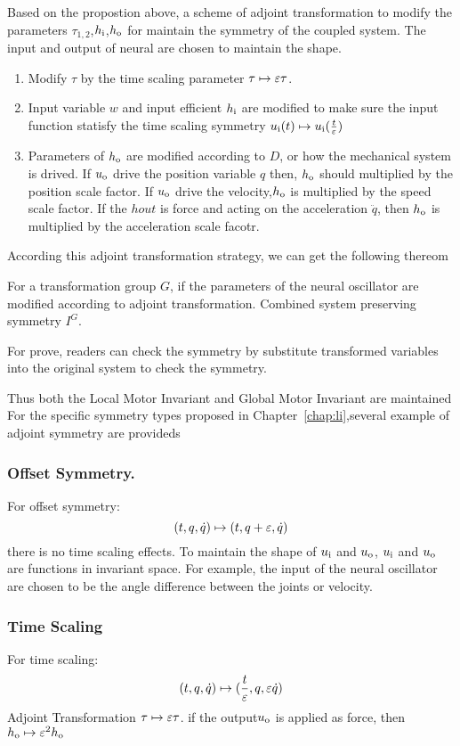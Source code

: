 Based on the propostion above, a scheme of adjoint transformation to modify the parameters $\tau_{1,2}$,$h_{\mathrm{i}}$,$h_{\mathrm{o}}$ for maintain the symmetry of the  coupled system.
The input and output of neural are chosen to maintain the shape.
\begin{enumerate}
\item Modify $\tau$ by the time scaling parameter $\tau \mapsto \varepsilon \tau$.
\item Input variable $w$ and input efficient $h_{\mathrm{i}}$ are modified to make sure the input function statisfy the time scaling symmetry $u_{\mathrm{i}}(t) \mapsto u_{\mathrm{i}}(\frac{t}{\varepsilon})$
\item  Parameters of $h_{\mathrm{o}}$ are modified according to $D$, or how the mechanical system is drived.
If $u_{\mathrm{o}}$ drive the position variable $q$ then, $h_{\mathrm{o}}$ should multiplied by the position scale factor. 
If $u_{\mathrm{o}}$ drive the velocity,$h_{\mathrm{o}}$ is multiplied by the speed scale factor.
If the $hout$ is force and acting on the acceleration $\ddot{q}$, then $h_{\mathrm{o}}$ is multiplied by the acceleration scale facotr.
\end{enumerate}


According this adjoint transformation strategy, we can get the following thereom
\begin{mythe}
For a transformation group $G$, if the parameters of the neural oscillator are modified according to adjoint transformation.
 Combined system preserving symmetry $I^G$.
\end{mythe}
For prove, readers can check the symmetry by substitute transformed variables into the original system to check the symmetry.

Thus both the Local Motor Invariant and Global Motor Invariant are maintained
For the specific symmetry types proposed in Chapter~\ref{chap:li},several example of adjoint symmetry are provideds


\subsubsection*{ Offset Symmetry.}
For offset symmetry:
\[
(t,q,\dot{q}) \mapsto (t,q+\varepsilon,\dot{q})
\]
there is no time scaling effects.
To maintain the shape of $u_{\mathrm{i}}$ and $u_{\mathrm{o}}$,  $u_{\mathrm{i}}$ and $u_{\mathrm{o}}$ are functions in invariant space.
For example, the input of the neural oscillator are chosen to be the angle difference between the joints or velocity.



\subsubsection*{Time Scaling}
For time scaling:
\[
(t,q,\dot{q}) \mapsto (\frac{t}{\varepsilon},q,\varepsilon \dot{q})
\]
Adjoint Transformation
$\tau \mapsto \varepsilon \tau $.
if the output$u_{\mathrm{o}}$ is applied as force, then $h_{\mathrm{o}} \mapsto \varepsilon^2 h_{\mathrm{o}}$

